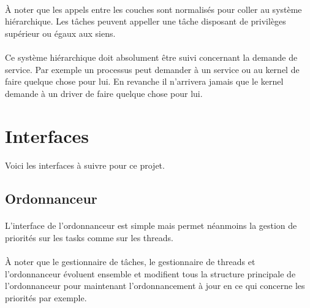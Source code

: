 \documentclass[10pt,a4wide]{article}
\begin{document}
\paragraph{}

\`A noter que les appels entre les couches sont normalis\'es pour coller
au syst\`eme hi\'erarchique. Les t\^aches peuvent appeller une t\^ache
disposant de privil\`eges sup\'erieur ou \'egaux aux siens.

\paragraph{}

Ce syst\`eme hi\'erarchique doit absolument \^etre suivi concernant la
demande de service. Par exemple un processus peut demander \`a un service
ou au kernel de faire quelque chose pour lui. En revanche il n'arrivera jamais
que le kernel demande \`a un driver de faire quelque chose pour lui.

\section{Interfaces}

\paragraph{}

Voici les interfaces \`a suivre pour ce projet.

\subsection{Ordonnanceur}

\paragraph{}

L'interface de l'ordonnanceur est simple mais permet n\'eanmoins la gestion
de priorit\'es sur les tasks comme sur les threads.

\paragraph{}

\`A noter que le gestionnaire de t\^aches, le gestionnaire de threads et
l'ordonnanceur \'evoluent ensemble et modifient tous la structure principale
de l'ordonnanceur pour maintenant l'ordonnancement \`a jour en ce qui
concerne les priorit\'es par exemple.
\end{document}
